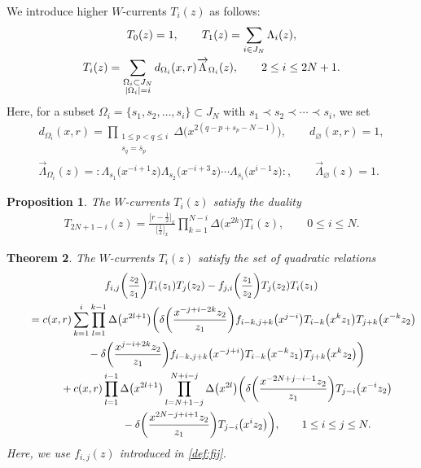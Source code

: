 \documentclass[10pt,a4paper]{amsart}
\numberwithin{equation}{section}
\newtheorem{Theorem}{Theorem}[section]
\newtheorem{Proposition}[Theorem]{Proposition}
\begin{document}
We introduce higher $W$-currents $T_i(z)$ as follows:
\begin{gather}
T_0(z)=1,\qquad
T_1(z)=\sum_{i \in J_N}\Lambda_i(z),\notag
\\
T_i(z)=\sum\limits_{\substack{\Omega_i \subset J_N\\|\Omega_i|=i}}
d_{\Omega_i}(x,r) \overrightarrow{\Lambda}_{\Omega_i}(z),\qquad
2 \leq i \leq 2N+1.
\label{def:Ti(z)}
\end{gather}
Here, for a subset $\Omega_i=\{s_1, s_2, \dots, s_i\}
\subset J_N$ with $s_1\prec s_2 \prec \cdots \prec s_i$, we set
\begin{gather*}
d_{\Omega_i}(x,r)=
\prod\limits_{\substack{1\leq p<q \leq i \\s_q=\overline{s}_p}}\Delta\big(x^{2(q-p+s_p-N-1)}\big),\qquad
d_{\varnothing}(x,r)=1,
\\
\overrightarrow{\Lambda}_{\Omega_i}(z)={:}\Lambda_{s_1}\big(x^{-i+1}z\big)\Lambda_{s_2}\big(x^{-i+3}z\big)
\cdots \Lambda_{s_i}\big(x^{i-1}z\big){:},\qquad
\overrightarrow{\Lambda}_{\varnothing}(z)=1.
\end{gather*}

\begin{Proposition}
\label{prop:3-1}
The $W$-currents $T_i(z)$ satisfy the duality
\begin{gather}
T_{2N+1-i}(z)=\frac{\big[r-\frac{1}{2}\big]_x}{\big[\frac{1}{2}\big]_x}\prod_{k=1}^{N-i}
\Delta\big(x^{2k}\big)T_i(z),\qquad
0\leq i \leq N.
\label{prop:duality}
\end{gather}
\end{Proposition}


\begin{Theorem}\label{thm:3-2}
The $W$-currents $T_i(z)$ satisfy the set of quadratic relations
\begin{gather}
f_{i,j}\bigg(\frac{z_2}{z_1}\bigg)T_i(z_1)T_j(z_2)-
f_{j,i}\bigg(\frac{z_1}{z_2}\bigg)T_j(z_2)T_i(z_1)\notag
\\ \qquad
{}=c(x,r)\sum_{k=1}^i \prod_{l=1}^{k-1}\Delta\big(x^{2l+1}\big)
\bigg(\delta\bigg(\frac{x^{-j+i-2k}z_2}{z_1}\bigg)
f_{i-k, j+k}\big(x^{j-i}\big)T_{i-k}\big(x^{k}z_1\big)T_{j+k}\big(x^{-k}z_2\big)\notag
\\ \qquad\hphantom{=}
{}-\delta\bigg(\frac{x^{j-i+2k}z_2}{z_1}\bigg)
f_{i-k, j+k}\big(x^{-j+i}\big)T_{i-k}\big(x^{-k}z_1\big)T_{j+k}\big(x^kz_2\big)\bigg)\notag
\\ \qquad\hphantom{=}
{}+ c(x,r)\prod_{l=1}^{i-1}\Delta\big(x^{2l+1}\big)
\prod_{l=N+1-j}^{N+i-j}\Delta\big(x^{2l}\big)\notag
\bigg(\delta\bigg(\frac{x^{-2N+j-i-1}z_2}{z_1}\bigg)T_{j-i}\big(x^{-i}z_2\big)
\\ \qquad\hphantom{=+ c(x,r)}
{}-\delta\bigg(\frac{x^{2N-j+i+1}z_2}{z_1}\bigg)T_{j-i}\big(x^{i}z_2\big)\bigg),\qquad
1\leq i \leq j \leq N
\label{thm:quadratic}.
\end{gather}
Here, we use $f_{i,j}(z)$ {introduced} in \eqref{def:fij}.
\end{Theorem}
\end{document}
